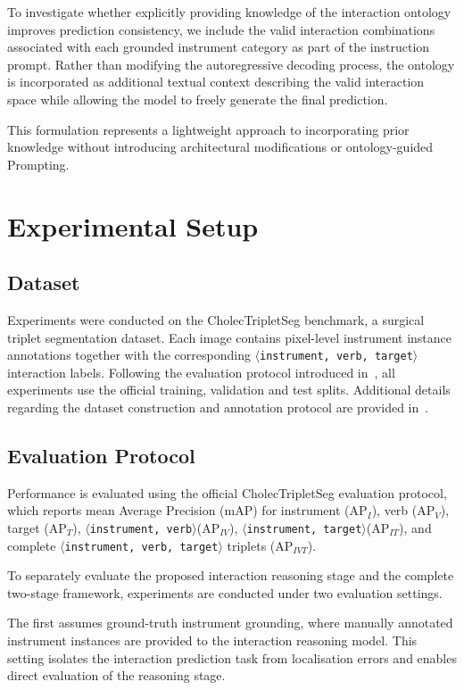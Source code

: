 \documentclass[11pt]{article}
\newcommand{\ivttriplet}{\texttt{$\langle$instrument, verb, target$\rangle$}\xspace}
\newcommand{\ivpair}{\texttt{$\langle$instrument, verb$\rangle$}\xspace}
\newcommand{\itpair}{\texttt{$\langle$instrument, target$\rangle$}\xspace}
\begin{document}
To investigate whether explicitly providing knowledge of the interaction ontology improves prediction consistency, we include the valid interaction combinations associated with each grounded instrument category as part of the instruction prompt. Rather than modifying the autoregressive decoding process, the ontology is incorporated as additional textual context describing the valid interaction space while allowing the model to freely generate the final prediction.

This formulation represents a lightweight approach to incorporating prior knowledge without introducing architectural modifications or ontology-guided Prompting.



\section{Experimental Setup}

\subsection{Dataset}
Experiments were conducted on the CholecTripletSeg benchmark, a surgical triplet segmentation dataset. Each image contains pixel-level instrument instance annotations together with the corresponding  \ivttriplet interaction labels. Following the evaluation protocol introduced in~\cite{alabi2026grounding}, all experiments use the official training, validation and test splits. Additional details regarding the dataset construction and annotation protocol are provided in~\cite{alabi2026grounding}.

\subsection{Evaluation Protocol}
Performance is evaluated using the official CholecTripletSeg evaluation protocol, which reports mean Average Precision (mAP) for instrument (AP$_I$), verb (AP$_V$), target (AP$_T$), \ivpair (AP$_{IV}$), \itpair (AP$_{IT}$), and complete \ivttriplet triplets (AP$_{IVT}$).

To separately evaluate the proposed interaction reasoning stage and the complete two-stage framework, experiments are conducted under two evaluation settings.

The first assumes ground-truth instrument grounding, where manually annotated instrument instances are provided to the interaction reasoning model. This setting isolates the interaction prediction task from localisation errors and enables direct evaluation of the reasoning stage.
\end{document}
